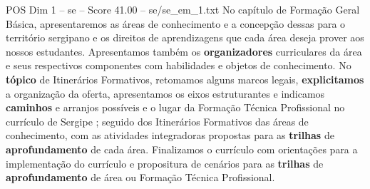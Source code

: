 \begin{textsample}{POS Dim 1 – se – Score 41.00 – se/se\_em\_1.txt}
No capítulo de Formação Geral Básica, apresentaremos as áreas de conhecimento e a concepção dessas para o território sergipano e os direitos de aprendizagens que cada área deseja prover aos nossos estudantes.
Apresentamos também os \textbf{organizadores} curriculares da área e seus respectivos componentes com habilidades e objetos de conhecimento.
No \textbf{tópico} de Itinerários Formativos, retomamos alguns marcos legais, \textbf{explicitamos} a organização da oferta, apresentamos os eixos estruturantes e indicamos \textbf{caminhos} e arranjos possíveis e o lugar da Formação Técnica Profissional no currículo de Sergipe ; seguido dos Itinerários Formativos das áreas de conhecimento, com as atividades integradoras propostas para as \textbf{trilhas} de \textbf{aprofundamento} de cada área.
Finalizamos o currículo com orientações para a implementação do currículo e propositura de cenários para as \textbf{trilhas} de \textbf{aprofundamento} de área ou Formação Técnica Profissional.

\end{textsample}
